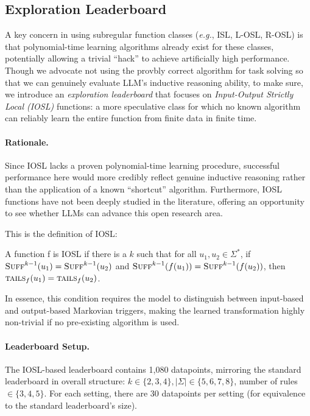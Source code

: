 \subsection{Exploration Leaderboard}
A key concern in using subregular function classes (\emph{e.g.}, ISL, L-OSL, R-OSL) is that polynomial-time learning algorithms already exist for these classes, potentially allowing a trivial ``hack'' to achieve artificially high performance. Though we advocate not using the provbly correct algorithm for task solving so that we can genuinely evaluate LLM's inductive reasoning ability, to make sure, we introduce an \emph{exploration leaderboard} that focuses on \emph{Input-Output Strictly Local (IOSL)} functions: a more speculative class for which no known algorithm can reliably learn the entire function from finite data in finite time.

\paragraph{Rationale.} Since IOSL lacks a proven polynomial-time learning procedure, successful performance here would more credibly reflect genuine inductive reasoning rather than the application of a known ``shortcut'' algorithm. Furthermore, IOSL functions have not been deeply studied in the literature, offering an opportunity to see whether LLMs can advance this open research area.


This is the definition of IOSL:
\begin{definition}[IOSL]
A function f is IOSL if there is a $k$ such that for all $u_1, u_2\in\Sigma^*$, if $\textsc{Suff}^{k-1}(u_1) = \textsc{Suff}^{k-1}(u_2)$ and $\textsc{Suff}^{k-1}(f(u_1)) = \textsc{Suff}^{k-1}(f(u_2))$, then $\textsc{tails}_f(u_1) = \textsc{tails}_f(u_2)$.
\end{definition}

In essence, this condition requires the model to distinguish between input-based and output-based Markovian triggers, making the learned transformation highly non-trivial if no pre-existing algorithm is used.

\paragraph{Leaderboard Setup.} The IOSL-based leaderboard contains 1{,}080 datapoints, mirroring the standard leaderboard in overall structure: $k\in\{2, 3, 4\}, |\Sigma|\in\{5, 6, 7, 8\}$, number of rules $\in\{3, 4, 5\}$. For each setting, there are 30 datapoints per setting (for equivalence to the standard leaderboard’s size).

